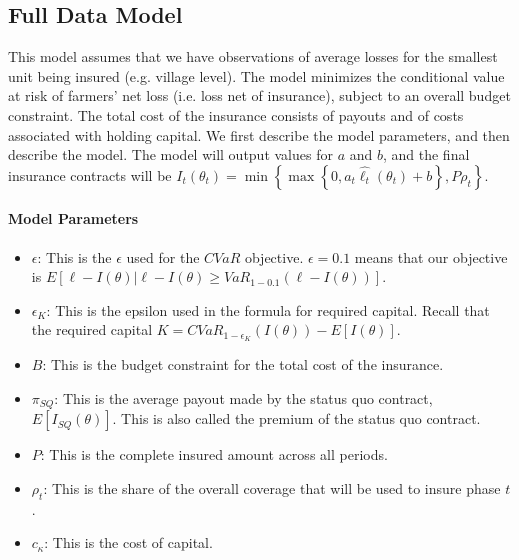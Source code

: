 \documentclass[11pt]{article}
\begin{document}
\subsection{Full Data Model}
\label{full-data-model}
This model assumes that we have observations of average losses for the smallest unit being insured (e.g. village level). The model minimizes the conditional value at risk of farmers' net loss (i.e. loss net of insurance), subject to an overall budget constraint. The total cost of the insurance consists of payouts and of costs associated with holding capital. We first describe the model parameters, and then describe the model. The model will output values for $a$ and $b$, and the final insurance contracts will be $I_t(\theta_t) = \min \left \{\max \left \{0,a_t\hat{\ell_t}(\theta_t) + b \right \}, P\rho_t \right \}$.
\paragraph*{Model Parameters}
\begin{itemize}
  \item $\epsilon$: This is the $\epsilon$ used for the $CVaR$ objective.  $\epsilon = 0.1$ means that our objective is $E[\ell - I(\theta)|\ell -I(\theta) \geq VaR_{1-0.1}\left ( \ell - I(\theta) \right )]$. 
  \item $\epsilon_K$: This is the epsilon used in the formula for required capital. Recall that the required capital $K = CVaR_{1-\epsilon_K}(I(\theta)) - E[I(\theta)]$.
  \item $B$: This is the budget constraint for the total cost of the insurance.
  \item $\pi_{SQ}$: This is the average payout made by the status quo contract, $E[I_{SQ}(\theta)]$. This is also called the premium of the status quo contract.  
  \item $P$: This is the complete insured amount across all periods. 
  \item $\rho_t$: This is the share of the overall coverage that will be used to insure phase $t$. 
  \item $c_{\kappa}$: This is the cost of capital. 
\end{itemize}
\end{document}
